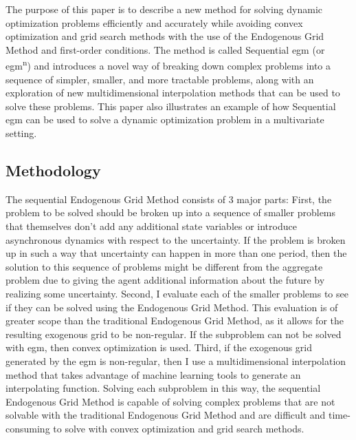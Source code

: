 \documentclass{article}
\begin{document}
The purpose of this paper is to describe a new method for solving dynamic optimization problems efficiently and accurately while avoiding convex optimization and grid search methods with the use of the Endogenous Grid Method and first-order conditions. The method is called Sequential \acrshort{egm} (or \acrshort{egm}\textsuperscript{n}) and introduces a novel way of breaking down complex problems into a sequence of simpler, smaller, and more tractable problems, along with an exploration of new multidimensional interpolation methods that can be used to solve these problems. This paper also illustrates an example of how Sequential \acrshort{egm} can be used to solve a dynamic optimization problem in a multivariate setting.

\subsection{Methodology}


The sequential Endogenous Grid Method consists of 3 major parts: First, the problem to be solved should be broken up into a sequence of smaller problems that themselves don't add any additional state variables or introduce asynchronous dynamics with respect to the uncertainty. If the problem is broken up in such a way that uncertainty can happen in more than one period, then the solution to this sequence of problems might be different from the aggregate problem due to giving the agent additional information about the future by realizing some uncertainty. Second, I evaluate each of the smaller problems to see if they can be solved using the Endogenous Grid Method. This evaluation is of greater scope than the traditional Endogenous Grid Method, as it allows for the resulting exogenous grid to be non-regular. If the subproblem can not be solved with \acrshort{egm}, then convex optimization is used. Third, if the exogenous grid generated by the \acrshort{egm} is non-regular, then I use a multidimensional interpolation method that takes advantage of machine learning tools to generate an interpolating function. Solving each subproblem in this way, the sequential Endogenous Grid Method is capable of solving complex problems that are not solvable with the traditional Endogenous Grid Method and are difficult and time-consuming to solve with convex optimization and grid search methods.
\end{document}
